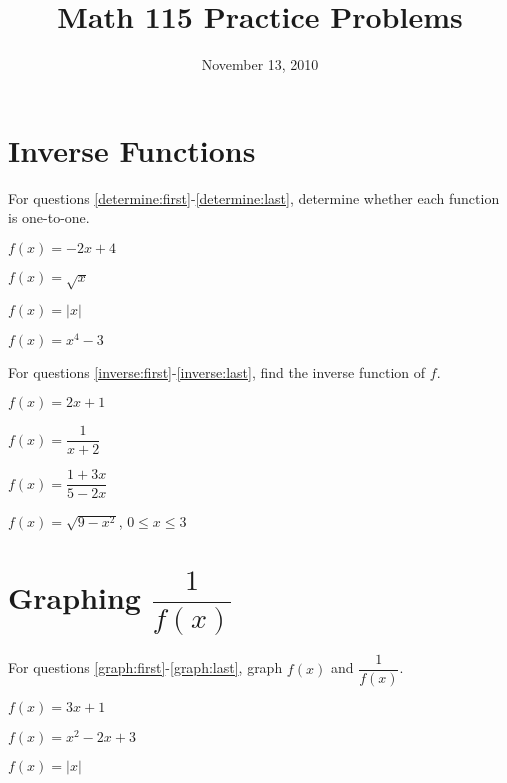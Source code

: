 \documentclass[fleqn,addpoints]{exam}
\title{Math 115 Practice Problems}
\date{November 13, 2010}
\begin{document}
\maketitle

\section{Inverse Functions}

\begin{questions}

\question 
For questions \ref{determine:first}-\ref{determine:last}, determine whether each function is one-to-one.

\question
\label{determine:first}
$f(x) = -2x + 4$
\vspace{2 cm}

\question
$f(x) = \sqrt{x}$
\vspace{2 cm}

\question
$f(x) = |x|$
\vspace{2 cm}

\question
\label{determine:last}
$f(x) = x^4 - 3$
\vspace{2 cm}

For questions \ref{inverse:first}-\ref{inverse:last}, find the inverse function of $f$.

\question 
\label{inverse:first}
$f(x) = 2x+1$
\vspace{2 cm}

\question 
$f(x) = \dfrac{1}{x+2}$
\vspace{2 cm}

\pagebreak

\question 
$f(x) = \dfrac{1+3x}{5-2x}$
\vspace{3 cm}

\question 
\label{inverse:last}
$f(x) = \sqrt{9-x^2}$, $0 \leq x \leq 3$
\vspace{3 cm}

\section{Graphing $\dfrac{1}{f(x)}$}

For questions \ref{graph:first}-\ref{graph:last}, graph $f(x)$ and $\dfrac{1}{f(x)}$.

\question 
\label{graph:first}
$f(x) = 3x + 1$
\vspace{3 cm}

\question
$f(x) = x^2 - 2x + 3$
\vspace{3 cm}

\question
\label{graph:last}
$f(x) = |x|$
\vspace{3 cm}

\end{questions}
\end{document}
